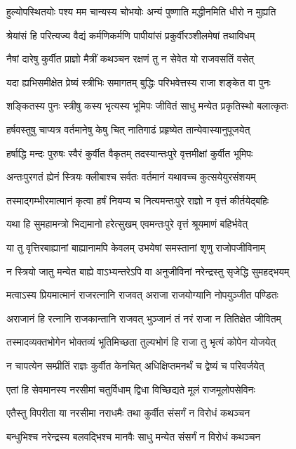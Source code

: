 \twolineshloka
{हुल्योपस्थितयोः पश्य मम चान्यस्य चोभयोः}
{अन्यं पुष्णाति मद्धीनमिति धीरो न मुह्यति}


\twolineshloka
{श्रेयांसं हि परित्यज्य वैद्यं कर्मणिकर्मणि}
{पापीयांसं प्रकुर्वीरञ्शीलमेषां तथाविधम्}


\twolineshloka
{नैषां दारेषु कुर्वीत प्राज्ञो मैत्रीं कथञ्चन}
{रक्षणं तु न सेवेत यो राजवसतिं वसेत्}


\twolineshloka
{यदा ह्यभिसमीक्षेत प्रेष्यं स्त्रीभिः समागतम्}
{बुद्धिः परिभवेत्तस्य राजा शङ्केत वा पुनः}


\twolineshloka
{शङ्कितस्य पुनः स्त्रीषु कस्य भृत्यस्य भूमिपः}
{जीवितं साधु मन्येत प्रकृतिस्थो बलात्कृतः}


\twolineshloka
{हर्षवस्तुषु चाप्यत्र वर्तमानेषु केषु चित्}
{नातिगाढं प्रहृष्येत तान्येवास्यानुपूजयेत्}


\twolineshloka
{हर्षाद्धि मन्दः पुरुषः स्वैरं कुर्वीत वैकृतम्}
{तदस्यान्तःपुरे वृत्तमीक्षां कुर्वीत भूमिपः}


\twolineshloka
{अन्तःपुरगतं ह्येनं स्त्रियः क्लीबाश्च सर्वतः}
{वर्तमानं यथावच्च कुत्सयेयुरसंशयम्}


\twolineshloka
{तस्माद्गम्भीरमात्मानं कृत्वा हर्षं नियम्य च}
{नित्यमन्तःपुरे राज्ञो न वृत्तं कीर्तयेद्बहिः}


\twolineshloka
{यथा हि सुमहामन्त्रो भिद्यमानो हरेत्सुखम्}
{एवमन्तःपुरे वृत्तं श्रूयमाणं बहिर्भवेत्}


\twolineshloka
{या तु वृत्तिरबाह्यानां बाह्यानामपि केवलम्}
{उभयेषां समस्तानां शृणु राजोपजीविनाम्}


\twolineshloka
{न स्त्रियो जातु मन्येत बाह्ये वाऽभ्यन्तरेऽपि वा}
{अनुजीविनां नरेन्द्रस्तु सृजेद्धि सुमहद्भयम्}


\twolineshloka
{मत्वाऽस्य प्रियमात्मानं राजरत्नानि राजवत्}
{अराजा राजयोग्यानि नोपयुञ्जीत पण्डितः}


\twolineshloka
{अराजानं हि रत्नानि राजकान्तानि राजवत्}
{भुञ्जानं तं नरं राजा न तितिक्षेत जीवितम्}


\twolineshloka
{तस्मादव्यक्तभोगेन भोक्तव्यं भूतिमिच्छता}
{तुल्यभोगं हि राजा तु भृत्यं कोपेन योजयेत्}


\twolineshloka
{न चापत्येन सम्प्रीतिं राज्ञः कुर्वीत केनचित्}
{अधिक्षिप्तमनर्थं च द्वेष्यं च परिवर्जयेत्}


\twolineshloka
{एतां हि सेवमानस्य नरसीमां चतुर्विधाम्}
{द्विधा विच्छिद्यते मूलं राजमूलोपसेविनः}


\twolineshloka
{एतैस्तु विपरीता या नरसीमा नराधमैः}
{तथा कुर्वीत संसर्गं न विरोधं कथञ्चन}


\twolineshloka
{बन्धुभिश्च नरेन्द्रस्य बलवद्भिश्च मानवैः}
{साधु मन्येत संसर्गं न विरोधं कथञ्चन}


